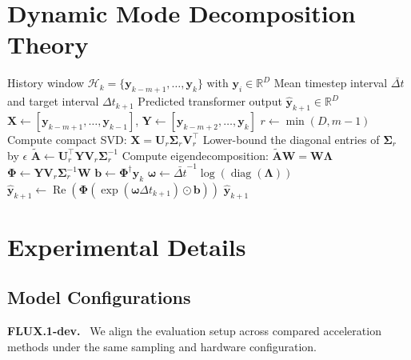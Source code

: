 
\section{Dynamic Mode Decomposition Theory}\label{app:dmd-theory}

\begin{algorithm}[H]
\caption{DMD Prediction for Diffusion Outputs}
\label{alg:app:dmd-predict}
\begin{algorithmic}[1]
\Require History window $\mathcal{H}_k = \{\mathbf{y}_{k-m+1}, \ldots, \mathbf{y}_k\}$ with $\mathbf{y}_i \in \mathbb{R}^D$
\Require Mean timestep interval $\bar{\Delta t}$ and target interval $\Delta t_{k+1}$
\Ensure Predicted transformer output $\hat{\mathbf{y}}_{k+1} \in \mathbb{R}^D$
\State $\mathbf{X} \gets [\mathbf{y}_{k-m+1}, \ldots, \mathbf{y}_{k-1}]$, \quad
       $\mathbf{Y} \gets [\mathbf{y}_{k-m+2}, \ldots, \mathbf{y}_k]$
\State $r \gets \min(D, m-1)$
\State Compute compact SVD:
       $\mathbf{X} = \mathbf{U}_r \boldsymbol{\Sigma}_r \mathbf{V}_r^{\top}$
\State Lower-bound the diagonal entries of $\boldsymbol{\Sigma}_r$ by $\epsilon$
\State $\tilde{\mathbf{A}} \gets
       \mathbf{U}_r^{\top}\mathbf{Y}\mathbf{V}_r\boldsymbol{\Sigma}_r^{-1}$
\State Compute eigendecomposition:
       $\tilde{\mathbf{A}}\mathbf{W} = \mathbf{W}\boldsymbol{\Lambda}$
\State $\mathbf{\Phi} \gets
       \mathbf{Y}\mathbf{V}_r\boldsymbol{\Sigma}_r^{-1}\mathbf{W}$
\State $\mathbf{b} \gets \mathbf{\Phi}^{\dagger}\mathbf{y}_k$
\State $\boldsymbol{\omega} \gets \bar{\Delta t}^{-1}\log\!\left(\operatorname{diag}(\boldsymbol{\Lambda})\right)$
\State $\hat{\mathbf{y}}_{k+1} \gets
       \operatorname{Re}\!\left(\mathbf{\Phi}\left(\exp(\boldsymbol{\omega}\Delta t_{k+1}) \odot \mathbf{b}\right)\right)$
\State \Return $\hat{\mathbf{y}}_{k+1}$
\end{algorithmic}
\end{algorithm}



\section{Experimental Details}\label{app:experimental-details}

\subsection{Model Configurations}\label{app:setup:model_configurations}
\textbf{FLUX.1-dev.}~\cite{flux2024}
We align the evaluation setup across compared acceleration methods
under the same sampling and hardware configuration.

